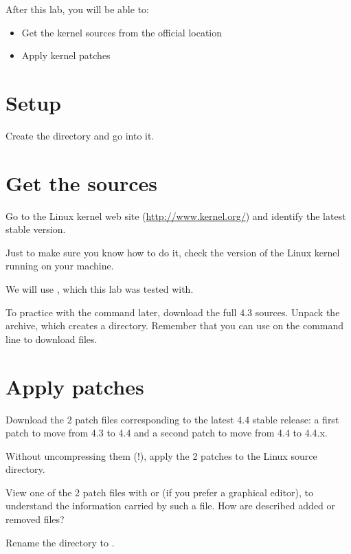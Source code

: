 
After this lab, you will be able to:
\begin{itemize}
\item Get the kernel sources from the official location
\item Apply kernel patches
\end{itemize}

\section{Setup}

Create the  directory and go into it.

\section{Get the sources}

Go to the Linux kernel web site (\url{http://www.kernel.org/}) and
identify the latest stable version.

Just to make sure you know how to do it, check the version of the
Linux kernel running on your machine.

We will use , which this lab was tested with.

To practice with the  command later, download the full 4.3
sources. Unpack the archive, which creates a 
directory. Remember that you can use  on the command
line to download files.

\section{Apply patches}

Download the 2 patch files corresponding to the latest 4.4 stable
release: a first patch to move from 4.3 to 4.4 and a second patch to
move from 4.4 to 4.4.x.

Without uncompressing them (!), apply the 2 patches to the Linux
source directory.

View one of the 2 patch files with  or 
(if you prefer a graphical editor), to understand the information carried
by such a file. How are described added or removed files?

Rename the  directory to .
